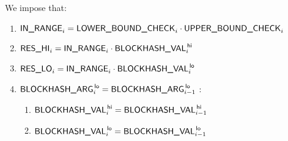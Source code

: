 We impose that:
\begin{enumerate}
	\item $\textsf{IN\_RANGE}_{i} = \textsf{LOWER\_BOUND\_CHECK}_{i} \cdot \textsf{UPPER\_BOUND\_CHECK}_{i}$
	\item $\textsf{RES}\textsf{\_HI}_{i} = \textsf{IN\_RANGE}_{i} \cdot \textsf{BLOCKHASH\_VAL}^{\mathsf{\,hi}}_{i}$
	\item $\textsf{RES}\textsf{\_LO}_{i} = \textsf{IN\_RANGE}_{i} \cdot \textsf{BLOCKHASH\_VAL}^{\mathsf{\,lo}}_{i}$
	\item \If $\textsf{BLOCKHASH\_ARG}^{\mathsf{\,lo}}_{i} = \textsf{BLOCKHASH\_ARG}^{\mathsf{\,lo}}_{i-1}$ \Then:
	\begin{enumerate}
		\item $\textsf{BLOCKHASH\_VAL}^{\mathsf{\,hi}}_{i} = \textsf{BLOCKHASH\_VAL}^{\mathsf{\,hi}}_{i-1}$
		\item $\textsf{BLOCKHASH\_VAL}^{\mathsf{\,lo}} _{i} = \textsf{BLOCKHASH\_VAL}^{\mathsf{\,lo}} _{i-1}$
	\end{enumerate}
\end{enumerate}
